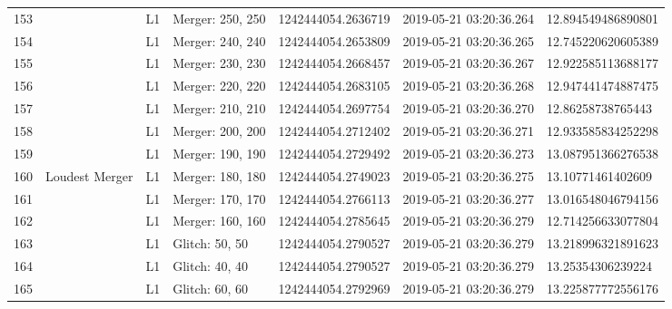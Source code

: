 \begin{longtable}{lllllll}
153  &                                                    &       L1 &  Merger: 250, 250 &  1242444054.2636719 &  2019-05-21 03:20:36.264 &  12.894549486890801 \\
154  &                                                    &       L1 &  Merger: 240, 240 &  1242444054.2653809 &  2019-05-21 03:20:36.265 &  12.745220620605389 \\
155  &                                                    &       L1 &  Merger: 230, 230 &  1242444054.2668457 &  2019-05-21 03:20:36.267 &  12.922585113688177 \\
156  &                                                    &       L1 &  Merger: 220, 220 &  1242444054.2683105 &  2019-05-21 03:20:36.268 &  12.947441474887475 \\
157  &                                                    &       L1 &  Merger: 210, 210 &  1242444054.2697754 &  2019-05-21 03:20:36.270 &   12.86258738765443 \\
158  &                                                    &       L1 &  Merger: 200, 200 &  1242444054.2712402 &  2019-05-21 03:20:36.271 &  12.933585834252298 \\
159  &                                                    &       L1 &  Merger: 190, 190 &  1242444054.2729492 &  2019-05-21 03:20:36.273 &  13.087951366276538 \\
160  &                                     Loudest Merger &       L1 &  Merger: 180, 180 &  1242444054.2749023 &  2019-05-21 03:20:36.275 &   13.10771461402609 \\
161  &                                                    &       L1 &  Merger: 170, 170 &  1242444054.2766113 &  2019-05-21 03:20:36.277 &  13.016548046794156 \\
162  &                                                    &       L1 &  Merger: 160, 160 &  1242444054.2785645 &  2019-05-21 03:20:36.279 &  12.714256633077804 \\
163  &                                                    &       L1 &    Glitch: 50, 50 &  1242444054.2790527 &  2019-05-21 03:20:36.279 &  13.218996321891623 \\
164  &                                                    &       L1 &    Glitch: 40, 40 &  1242444054.2790527 &  2019-05-21 03:20:36.279 &   13.25354306239224 \\
165  &                                                    &       L1 &    Glitch: 60, 60 &  1242444054.2792969 &  2019-05-21 03:20:36.279 &  13.225877772556176 \\

\end{longtable}
